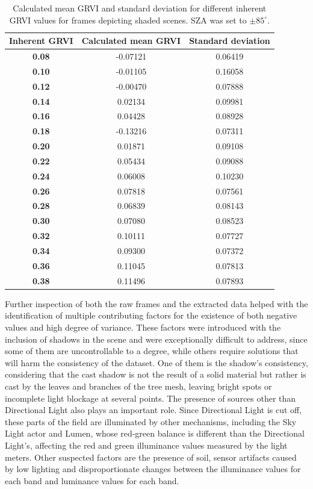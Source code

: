 \begin{table}[htb]
    \centering
    \caption{Calculated mean GRVI and standard deviation for different inherent GRVI values for frames depicting shaded scenes. SZA was set to $\pm 85^\circ$.}
    \label{grvi_stats_gloomy}
    \renewcommand{\arraystretch}{1.15}
    \begin{tabular}{c!{\vrule width 1.2pt}cc}
        \hline
        \textbf{Inherent GRVI} & \textbf{Calculated mean GRVI} & \textbf{Standard deviation} \\
        \hline
        \textbf{0.08} & -0.07121 & 0.06419 \\
        \textbf{0.10} & -0.01105 & 0.16058 \\
        \textbf{0.12} & -0.00470 & 0.07888 \\
        \textbf{0.14} & 0.02134 & 0.09981 \\
        \textbf{0.16} & 0.04428 & 0.08928 \\
        \textbf{0.18} & -0.13216 & 0.07311 \\
        \textbf{0.20} & 0.01871 & 0.09108 \\
        \textbf{0.22} & 0.05434 & 0.09088 \\
        \textbf{0.24} & 0.06008 & 0.10230 \\
        \textbf{0.26} & 0.07818 & 0.07561 \\
        \textbf{0.28} & 0.06839 & 0.08143 \\
        \textbf{0.30} & 0.07080 & 0.08523 \\
        \textbf{0.32} & 0.10111 & 0.07727 \\
        \textbf{0.34} & 0.09300 & 0.07372 \\
        \textbf{0.36} & 0.11045 & 0.07813 \\
        \textbf{0.38} & 0.11496 & 0.07893 \\
        \hline
    \end{tabular}
\end{table}


Further inspection of both the raw frames and the extracted data helped with the identification of multiple contributing factors for the existence of both negative values and high degree of variance. These factors were introduced with the inclusion of shadows in the scene and were exceptionally difficult to address, since some of them are uncontrollable to a degree, while others require solutions that will harm the consistency of the dataset. One of them is the shadow's consistency, considering that the cast shadow is not the result of a solid material but rather is cast by the leaves and branches of the tree mesh, leaving bright spots or incomplete light blockage at several points. The presence of sources other than Directional Light also plays an important role. Since Directional Light is cut off, these parts of the field are illuminated by other mechanisms, including the Sky Light actor and Lumen, whose red-green balance is different than the Directional Light's, affecting the red and green illuminance values measured by the light meters. Other suspected factors are the presence of soil, sensor artifacts caused by low lighting and disproportionate changes between the illuminance values for each band and luminance values for each band.

